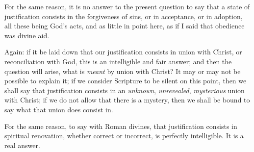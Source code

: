 For the same reason, it is no answer to the present question to say
that a state of justification consists in the forgiveness of sins, or
in acceptance, or in adoption, all these being God's acts, and as
little in point here, as if I said that obedience was divine aid.

Again: if it be laid down that our justification consists in union
with Christ, or reconciliation with God, this is an intelligible and
fair answer; and then the question will arise, what is \emph{meant} by
union with Christ? It may or may not be possible to explain it; if we
consider Scripture to be silent on this point, then we shall say that
justification consists in an \emph{unknown}, \emph{unrevealed}, \emph{mysterious}
union with Christ; if we do not allow that there is a mystery, then we
shall be bound to say what that union does consist in.

For the same reason, to say with Roman divines, that justification
consists in spiritual renovation, whether correct or incorrect, is
perfectly intelligible. It is a real answer.

